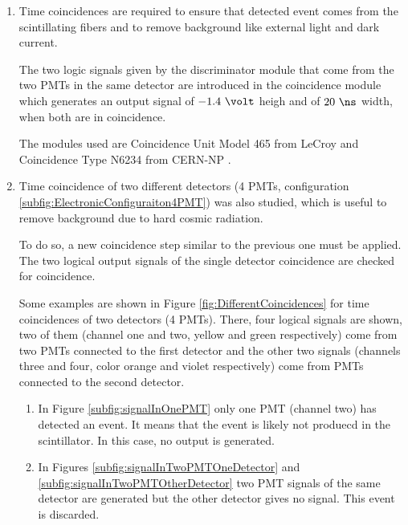 \begin{enumerate}
\begin{enumerate}
\item{} Time coincidences are required to ensure that detected event comes from the scintillating fibers and to remove background like external light and dark current. %

The two logic signals given by the discriminator module that come from the two PMTs in the same detector are introduced in the coincidence module which generates an output signal of $-1.4~\volt$ heigh and of $20~\ns$ width, when both are in coincidence.

The modules used are Coincidence Unit Model 465 from LeCroy \cite{DataSheetCoincidenceLeCroy} and Coincidence Type N6234 from CERN-NP \cite{DataSheetCoincidenceCERN}.

\item{} Time coincidence of two different detectors (4 PMTs, configuration \ref{subfig:ElectronicConfiguraiton4PMT}) was also studied, which is useful to remove background due to hard cosmic radiation.

To do so, a new coincidence step similar to the previous one must be applied. The two logical output signals of the single detector coincidence are checked for coincidence.

Some examples are shown in Figure \ref{fig:DifferentCoincidences} for time coincidences of two detectors (4 PMTs). There, four logical signals are shown, two of them (channel one and two, yellow and green respectively) come from two PMTs connected to the first detector and the other two signals (channels three and four, color orange and violet respectively) come from PMTs connected to the second detector.

\begin{enumerate}
\item{} In Figure \ref{subfig:signalInOnePMT} only one PMT (channel two) has detected an event. It means that the event is likely not produecd in the scintillator. In this case, no output is generated.

\item{} In Figures \ref{subfig:signalInTwoPMTOneDetector} and \ref{subfig:signalInTwoPMTOtherDetector} two PMT signals of the same detector are generated but the other detector gives no signal. This event is discarded.


\end{enumerate}
\end{enumerate}
\end{enumerate}
